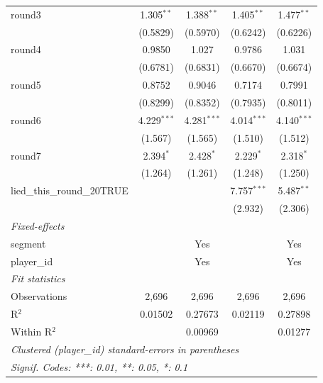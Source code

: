 \begin{tabular}{lcccc}
   round3                       & 1.305$^{**}$         & 1.388$^{**}$        & 1.405$^{**}$     & 1.477$^{**}$\\   
                                & (0.5829)             & (0.5970)            & (0.6242)         & (0.6226)\\   
   round4                       & 0.9850               & 1.027               & 0.9786           & 1.031\\   
                                & (0.6781)             & (0.6831)            & (0.6670)         & (0.6674)\\   
   round5                       & 0.8752               & 0.9046              & 0.7174           & 0.7991\\   
                                & (0.8299)             & (0.8352)            & (0.7935)         & (0.8011)\\   
   round6                       & 4.229$^{***}$        & 4.281$^{***}$       & 4.014$^{***}$    & 4.140$^{***}$\\   
                                & (1.567)              & (1.565)             & (1.510)          & (1.512)\\   
   round7                       & 2.394$^{*}$          & 2.428$^{*}$         & 2.229$^{*}$      & 2.318$^{*}$\\   
                                & (1.264)              & (1.261)             & (1.248)          & (1.250)\\   
   lied\_this\_round\_20TRUE    &                      &                     & 7.757$^{***}$    & 5.487$^{**}$\\   
                                &                      &                     & (2.932)          & (2.306)\\   
   \midrule
   \emph{Fixed-effects}\\
   segment                      &                      & Yes                 &                  & Yes\\  
   player\_id                   &                      & Yes                 &                  & Yes\\  
   \midrule
   \emph{Fit statistics}\\
   Observations                 & 2,696                & 2,696               & 2,696            & 2,696\\  
   R$^2$                        & 0.01502              & 0.27673             & 0.02119          & 0.27898\\  
   Within R$^2$                 &                      & 0.00969             &                  & 0.01277\\  
   \midrule \midrule
   \multicolumn{5}{l}{\emph{Clustered (player\_id) standard-errors in parentheses}}\\
   \multicolumn{5}{l}{\emph{Signif. Codes: ***: 0.01, **: 0.05, *: 0.1}}\\
\end{tabular}
\par\endgroup


